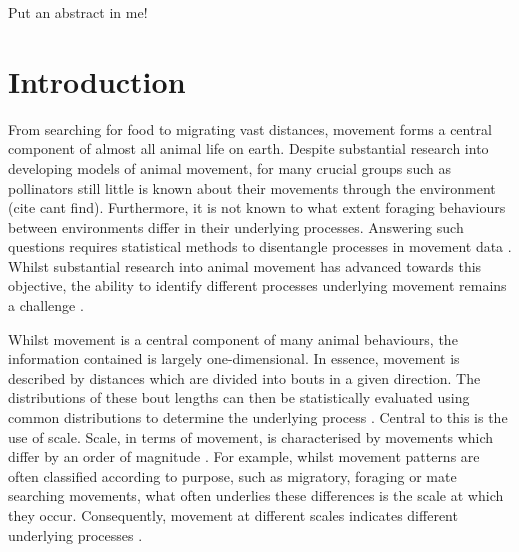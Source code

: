 \documentclass[11pt,usenames,dvipsnames,a4paper]{article}
\begin{document}
\begin{linenumbers}
Put an abstract in me!
\end{linenumbers}

\section{Introduction}

\begin{linenumbers}
\hspace{\parindent}
From searching for food to migrating vast distances, movement forms a central component of almost all animal life on earth. Despite substantial research into developing models of animal movement, for many crucial groups such as pollinators still little is known about their movements through the environment (cite cant find). Furthermore, it is not known to what extent foraging behaviours between environments differ in their underlying processes. Answering such questions requires statistical methods to disentangle processes in movement data \citep{Nathan2008}. Whilst substantial research into animal movement has advanced towards this objective, the ability to identify different processes underlying movement remains a challenge \citep{Patterson2017}. 

Whilst movement is a central component of many animal behaviours, the information contained is largely one-dimensional. In essence, movement is described by distances which are divided into bouts in a given direction. The distributions of these bout lengths can then be statistically evaluated using common distributions to determine the underlying process \citep{Murphy2007, Reynolds2018}. Central to this is the use of scale. Scale, in terms of movement, is characterised by movements which differ by an order of magnitude \citep{Levin1992}. For example, whilst movement patterns are often classified according to purpose, such as migratory, foraging or mate searching movements, what often underlies these differences is the scale at which they occur. Consequently, movement at different scales indicates different underlying processes \citep{Nathan2008}. 


\end{linenumbers}
\end{document}
